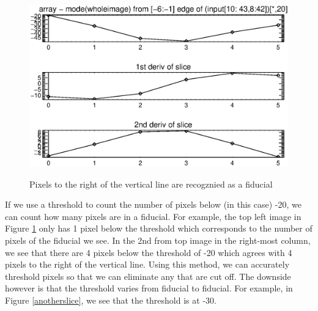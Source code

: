 \documentclass[10pt]{article}
\begin{document}
\begin{figure}[!ht]
{        \includegraphics[width=0.5\linewidth, height = .34\textheight, keepaspectratio=true]{plots_tables_images/betterslice5.eps}
        }
        \caption{Pixels to the right of the vertical line are recogznied as a fiducial}
        \label{betterslice}
\end{figure}

If we use a threshold to count the number of pixels below (in this case) -20, we can count how many pixels are in a fiducial. For example, the top left image in Figure \ref{betterslice} only has 1 pixel below the threshold which corresponds to the number of pixels of the fiducial we see. In the 2nd from top image in the right-most column, we see that there are 4 pixels below the threshold of -20 which agrees with 4 pixels to the right of the vertical line. Using this method, we can accurately threshold pixels so that we can eliminate any that are cut off. The downside however is that the threshold varies from fiducial to fiducial. For example, in Figure \ref{anotherslice}, we see that the threshold is at -30.
\end{document}
